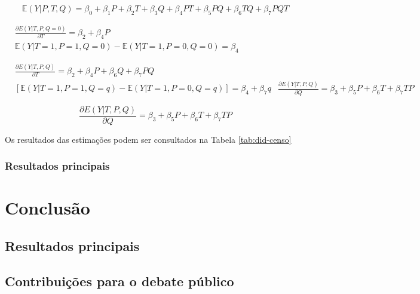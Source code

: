 \begin{equation}
    \mathbb{E}(Y|P,T,Q) = \beta_0 + \beta_1P + \beta_2T + \beta_3Q + \beta_4PT + \beta_5PQ + \beta_6TQ + \beta_7PQT
    \label{eq:did}
\end{equation}

\begin{align}
    &\frac{\partial E(Y|T,P,Q=0)}{\partial T} = \beta_2 + \beta_4P\\\label{eq:did-b4}
    &\mathbb{E}(Y|T=1,P=1,Q=0) - \mathbb{E}(Y|T=1,P=0,Q=0)= \beta_4\\\nonumber\\\nonumber\\
    &\frac{\partial E(Y|T,P,Q)}{\partial T} = \beta_2 + \beta_4P + \beta_6Q + \beta_7PQ\\\label{eq:did-b7}
    &[\mathbb{E}(Y|T=1,P=1,Q=q) - \mathbb{E}(Y|T=1,P=0,Q=q)]= \beta_4 + \beta_7q
    &\frac{\partial E(Y|T,P,Q)}{\partial Q} = \beta_3 + \beta_5P + \beta_6T + \beta_7TP    
\end{align}

\begin{equation}
    \frac{\partial E(Y|T,P,Q)}{\partial Q} = \beta_3 + \beta_5P + \beta_6T + \beta_7TP
\end{equation}  

Os resultados das estimações podem ser consultados na Tabela \ref{tab:did-censo}






\subsection{Resultados principais}


\chapter{Conclusão}
\label{chp:conclusao}

\section{Resultados principais}
\label{sec:conclusao}

\section{Contribuições para o debate público}
\label{sec:contribuicoes}

